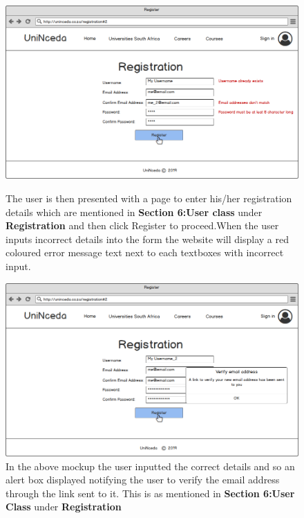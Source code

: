 \documentclass[a4paper, 12pt]{article}
\begin{document}
\begin{figure}[H]
\centering
\includegraphics[scale=0.45]{Registration(2)InvalidDetails}
\caption{The user is then presented with a page to enter his/her registration details which are mentioned in \textbf{Section 6:User class}  under \textbf{Registration} and then click Register to proceed.When the user inputs incorrect details into the form the website will display a red coloured error message text next to each textboxes with incorrect input.}
\label{Registration(2)InvalidDetails}

\vspace{1cm}
\setcounter{figure}{1}

\includegraphics[scale=0.45]{Registration(2)}
\caption{In the above mockup the user inputted the correct details and so an alert box displayed notifying the user to verify the email address through the link sent to it. This is as mentioned in \textbf{Section 6:User Class} under \textbf{Registration}}
\label{Registration(2)}
\end{figure}
\end{document}
